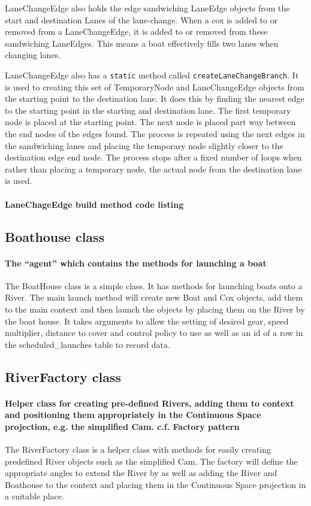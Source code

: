 LaneChangeEdge also holds the edge sandwiching LaneEdge objects from
the start and destination Lanes of the lane-change. When a cox is
added to or removed from a LaneChangeEdge, it is added to or removed
from these sandwiching LaneEdges. This means a boat effectively fills
two lanes when changing lanes.

LaneChangeEdge also has a \texttt{static} method called \texttt{createLaneChangeBranch}. It is used to creating this
set of TemporaryNode and LaneChangeEdge objects from the starting
point to the destination lane. It does this by finding the nearest
edge to the starting point in the starting and destination lane. The
first temporary node is placed at the starting point. The next node is
placed part way between the end nodes of the edges found. The process
is repeated using the next edges in the sandwiching lanes and placing
the temporary node slightly closer to the destination edge end
node. The process stops after a fixed number of loops when rather than
placing a temporary node, the actual node from the destination lane is
used.

\paragraph{LaneChageEdge build method code listing}

\subsection{Boathouse class}
\paragraph{The ``agent'' which contains the methods for launching a boat}
The BoatHouse class is a simple class. It has methods for launching
boats onto a River. The main launch method will create new Boat and
Cox objects, add them to the main context and then launch the objects
by placing them on the River by the boat house. It takes arguments to
allow the setting of desired gear, speed multiplier, distance to
cover and control policy to use as well as an id of a row in the
scheduled\_launches table to record data.

\subsection{RiverFactory class}
\paragraph{Helper class for creating pre-defined Rivers, adding them
  to context and positioning them appropriately in the Continuous
  Space projection, e.g. the simplified Cam. c.f. Factory pattern}
The RiverFactory class is a helper class with methods for easily creating
predefined River objects such as the simplified Cam. The factory will
define the appropriate angles to extend the River by as well as adding
the River and Boathouse to the context and placing them in the
Continuous Space projection in a suitable place.

